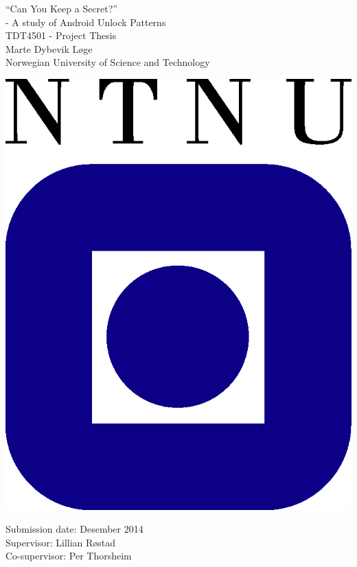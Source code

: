 \begin{titlepage}
\begin{center}

	{\Huge ``Can You Keep a Secret?''\\ [0.4cm]
	- A study of Android Unlock Patterns} \\[1.5cm]


	{\Large TDT4501 - Project Thesis} \\[2.0cm]
	{\Large Marte Dybevik Løge} \\ [0.5cm]
	{\Large Norwegian University of Science and Technology}\\

	\vspace{3.5cm}

			\includegraphics{pics/ntnu-logo2.png}

	\vspace{3.5cm}

	{\Large Submission date: Desember 2014} \\[0.2cm]
	{\Large Supervisor: Lillian Røstad} \\ [0.2cm]
	{\Large Co-supervisor: Per Thorsheim}


\end{center}
\end{titlepage}